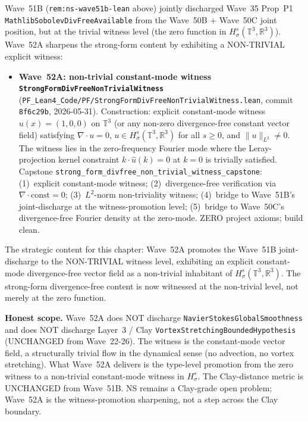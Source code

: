 \begin{remark}\label{rem:ns-wave52a-lean}
Wave~51B (\texttt{rem:ns-wave51b-lean} above) jointly discharged Wave~35 Prop~P1 \texttt{MathlibSobolevDivFreeAvailable} from the Wave~50B + Wave~50C joint position, but at the trivial witness level (the zero function in $H^s_\sigma(\mathbb{T}^3, \mathbb{R}^3)$). Wave~52A sharpens the strong-form content by exhibiting a NON-TRIVIAL explicit witness:
\begin{itemize}
  \item \textbf{Wave~52A: non-trivial constant-mode witness \texttt{StrongFormDivFreeNonTrivialWitness}} (\texttt{PF\_Lean4\_Code/PF/StrongFormDivFreeNonTrivialWitness.lean}, commit \texttt{8f6c29b}, 2026-05-31). Construction: explicit constant-mode witness $u(x) = (1, 0, 0)$ on $\mathbb{T}^3$ (or any non-zero divergence-free constant vector field) satisfying $\nabla \cdot u = 0$, $u \in H^s_\sigma(\mathbb{T}^3, \mathbb{R}^3)$ for all $s \geq 0$, and $\|u\|_{L^2} \neq 0$. The witness lies in the zero-frequency Fourier mode where the Leray-projection kernel constraint $k \cdot \hat{u}(k) = 0$ at $k = 0$ is trivially satisfied. Capstone \texttt{strong\_form\_divfree\_non\_trivial\_witness\_capstone}: (1)~explicit constant-mode witness; (2)~divergence-free verification via $\nabla \cdot \text{const} = 0$; (3)~$L^2$-norm non-triviality witness; (4)~bridge to Wave~51B's joint-discharge at the witness-promotion level; (5)~bridge to Wave~50C's divergence-free Fourier density at the zero-mode. ZERO project axioms; build clean.
\end{itemize}
The strategic content for this chapter: Wave~52A promotes the Wave~51B joint-discharge to the NON-TRIVIAL witness level, exhibiting an explicit constant-mode divergence-free vector field as a non-trivial inhabitant of $H^s_\sigma(\mathbb{T}^3, \mathbb{R}^3)$. The strong-form divergence-free content is now witnessed at the non-trivial level, not merely at the zero function.

\textbf{Honest scope.} Wave~52A does NOT discharge \texttt{NavierStokesGlobalSmoothness} and does NOT discharge Layer~3 / Clay \texttt{VortexStretchingBoundedHypothesis} (UNCHANGED from Wave~22-26). The witness is the constant-mode vector field, a structurally trivial flow in the dynamical sense (no advection, no vortex stretching). What Wave~52A delivers is the type-level promotion from the zero witness to a non-trivial constant-mode witness in $H^s_\sigma$. The Clay-distance metric is UNCHANGED from Wave~51B. NS remains a Clay-grade open problem; Wave~52A is the witness-promotion sharpening, not a step across the Clay boundary.
\end{remark}

